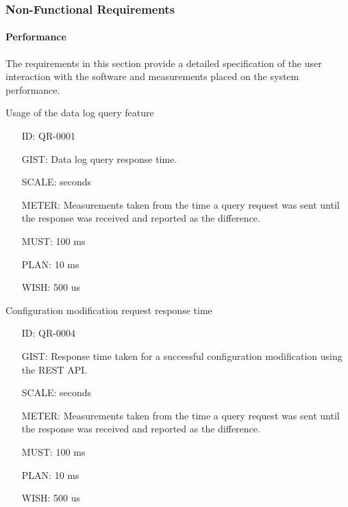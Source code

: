     \newpage

    \subsubsection{Non-Functional Requirements}\label{sec:req-srs-non-func}

      \paragraph{Performance}

        The requirements in this section provide a detailed specification of
        the user interaction with the software and measurements placed on the
        system performance.

        Usage of the data log query feature

        \begin{itemize}
          \setlength{\itemindent}{.5in}
          \itemsep .15em
          \item[ID:] QR-0001
          \item[GIST:] Data log query response time.
          \item[SCALE:] seconds
          \item[METER:] Measurements taken from the time a query request was
            sent until the response was received and reported as the difference.
          \item[MUST:] 100 ms
          \item[PLAN:] 10 ms
          \item[WISH:] 500 us
        \end{itemize}

        Configuration modification request response time

        \begin{itemize}
          \setlength{\itemindent}{.5in}
          \itemsep .15em
          \item[ID:] QR-0004
          \item[GIST:] Response time taken for a successful configuration
            modification using the REST API.
          \item[SCALE:] seconds
          \item[METER:] Measurements taken from the time a query request was
            sent until the response was received and reported as the difference.
          \item[MUST:] 100 ms
          \item[PLAN:] 10 ms
          \item[WISH:] 500 us
        \end{itemize}

